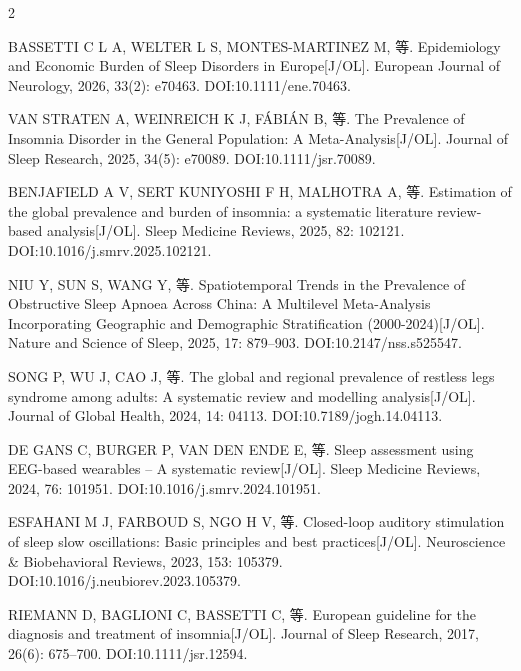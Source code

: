 \documentclass[UTF8,zihao=5,fontset=none]{ctexart}
\newcommand{\song}{\CJKfamily{song}}
\newcommand{\hei}{\CJKfamily{hei}}
\begin{document}
\begin{multicols}{2}
\vspace{15.6pt}\noindent{\hei\fontsize{12pt}{15.6pt}\selectfont\bfseries 参考文献}\par\vspace{8pt}
{\song\fontsize{7.5pt}{9pt}\selectfont\setlength{\parindent}{0pt}\setlength{\parskip}{0pt}%
\sloppy
{}
\makebox[25.2pt][l]{[1]}BASSETTI C L A, WELTER L S, MONTES-MARTINEZ M, 等. Epidemiology and Economic Burden of Sleep Disorders in Europe[J/OL]. European Journal of Neurology, 2026, 33(2): e70463. DOI:10.1111/ene.70463.\par
\makebox[25.2pt][l]{[2]}VAN STRATEN A, WEINREICH K J, FÁBIÁN B, 等. The Prevalence of Insomnia Disorder in the General Population: A Meta-Analysis[J/OL]. Journal of Sleep Research, 2025, 34(5): e70089. DOI:10.1111/jsr.70089.\par
\makebox[25.2pt][l]{[3]}BENJAFIELD A V, SERT KUNIYOSHI F H, MALHOTRA A, 等. Estimation of the global prevalence and burden of insomnia: a systematic literature review-based analysis[J/OL]. Sleep Medicine Reviews, 2025, 82: 102121. DOI:10.1016/j.smrv.2025.102121.\par
\makebox[25.2pt][l]{[4]}NIU Y, SUN S, WANG Y, 等. Spatiotemporal Trends in the Prevalence of Obstructive Sleep Apnoea Across China: A Multilevel Meta-Analysis Incorporating Geographic and Demographic Stratification (2000-2024)[J/OL]. Nature and Science of Sleep, 2025, 17: 879--903. DOI:10.2147/nss.s525547.\par
\makebox[25.2pt][l]{[5]}SONG P, WU J, CAO J, 等. The global and regional prevalence of restless legs syndrome among adults: A systematic review and modelling analysis[J/OL]. Journal of Global Health, 2024, 14: 04113. DOI:10.7189/jogh.14.04113.\par
\makebox[25.2pt][l]{[6]}DE GANS C, BURGER P, VAN DEN ENDE E, 等. Sleep assessment using EEG-based wearables – A systematic review[J/OL]. Sleep Medicine Reviews, 2024, 76: 101951. DOI:10.1016/j.smrv.2024.101951.\par
\makebox[25.2pt][l]{[7]}ESFAHANI M J, FARBOUD S, NGO H V, 等. Closed-loop auditory stimulation of sleep slow oscillations: Basic principles and best practices[J/OL]. Neuroscience \& Biobehavioral Reviews, 2023, 153: 105379. DOI:10.1016/j.neubiorev.2023.105379.\par
\makebox[25.2pt][l]{[8]}RIEMANN D, BAGLIONI C, BASSETTI C, 等. European guideline for the diagnosis and treatment of insomnia[J/OL]. Journal of Sleep Research, 2017, 26(6): 675--700. DOI:10.1111/jsr.12594.\par
}
\end{multicols}
\end{document}
